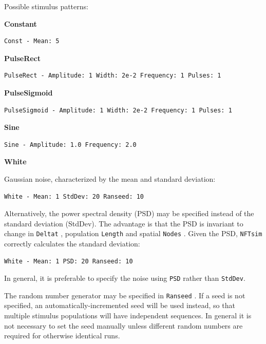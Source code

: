 \documentclass[12pt,a4paper]{article}
\newcommand{\type}[1]{{\small\small\tt #1} }
\newcommand{\NF}[0]{\type{NFTsim}}
\begin{document}
\begin{description}
\begin{itemize}
    Possible stimulus patterns:

    \vspace{5mm}
    \textbf{Constant}
    \begin{lstlisting}
Const - Mean: 5
    \end{lstlisting}

    \vspace{5mm}
    \textbf{PulseRect}
    \begin{lstlisting}
PulseRect - Amplitude: 1 Width: 2e-2 Frequency: 1 Pulses: 1
    \end{lstlisting}

    \vspace{5mm}
    \textbf{PulseSigmoid}
    \begin{lstlisting}
PulseSigmoid - Amplitude: 1 Width: 2e-2 Frequency: 1 Pulses: 1
    \end{lstlisting}

    \vspace{5mm}
    \textbf{Sine}
    \begin{lstlisting}
Sine - Amplitude: 1.0 Frequency: 2.0
    \end{lstlisting}

    \vspace{5mm}
    \textbf{White}

    Gaussian noise, characterized by the mean and standard deviation:
    \begin{lstlisting}
White - Mean: 1 StdDev: 20 Ranseed: 10
    \end{lstlisting}

    Alternatively, the power spectral density (PSD) may be specified instead of the standard deviation (StdDev). The advantage is that the PSD is invariant to change in \type{Deltat}, population \type{Length} and spatial \type{Nodes}. Given the PSD, \NF correctly calculates the standard deviation:
    \begin{lstlisting}
White - Mean: 1 PSD: 20 Ranseed: 10
    \end{lstlisting}

    In general, it is preferable to specify the noise using \texttt{PSD} rather than \texttt{StdDev}. 

    The random number generator may be specified in \type{Ranseed}. If a seed is not specified, an automatically-incremented seed will be used instead, so that multiple stimulus populations will have independent sequences. In general it is not necessary to set the seed manually unless different random numbers are required for otherwise identical runs.


\end{itemize}
\end{description}
\end{document}

